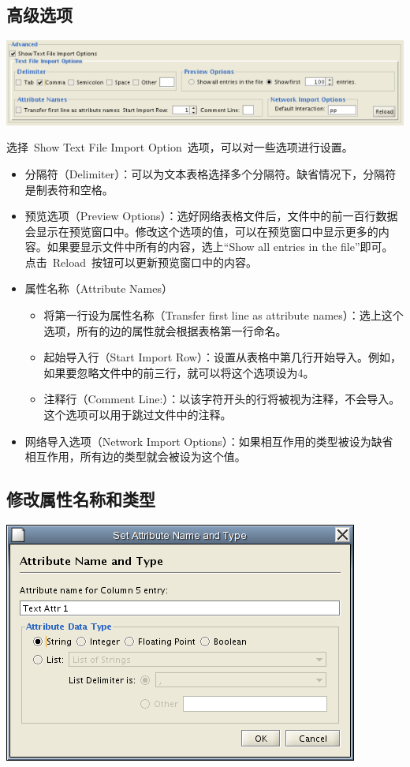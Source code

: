 \subsection{高级选项}
\begin{center}
 \includegraphics[width=.8\textwidth]{images/network_import_advanced.png} 
\end{center}
选择~Show Text File Import Option~选项，可以对一些选项进行设置。
\begin{itemize}
\item 分隔符（Delimiter）：可以为文本表格选择多个分隔符。缺省情况下，分隔符是制表符和空格。
\item 预览选项（Preview Options）：选好网络表格文件后，文件中的前一百行数据会显示在预览窗口中。修改这个选项的值，可以在预览窗口中显示更多的内容。如果要显示文件中所有的内容，选上``Show all entries in the file''即可。点击~Reload~按钮可以更新预览窗口中的内容。
\item 属性名称（Attribute Names）
\begin{itemize}
\item 将第一行设为属性名称（Transfer first line as attribute names）：选上这个选项，所有的边的属性就会根据表格第一行命名。
\item 起始导入行（Start Import Row）：设置从表格中第几行开始导入。例如，如果要忽略文件中的前三行，就可以将这个选项设为4。
\item 注释行（Comment Line:）：以该字符开头的行将被视为注释，不会导入。这个选项可以用于跳过文件中的注释。
\end{itemize}
\item 网络导入选项（Network Import Options）：如果相互作用的类型被设为缺省相互作用，所有边的类型就会被设为这个值。
\end{itemize}
 
\subsection{修改属性名称和类型}

\begin{center}
 \includegraphics[width=.6\textwidth]{images/network_table_attr_dialog1.png} 
\end{center}

